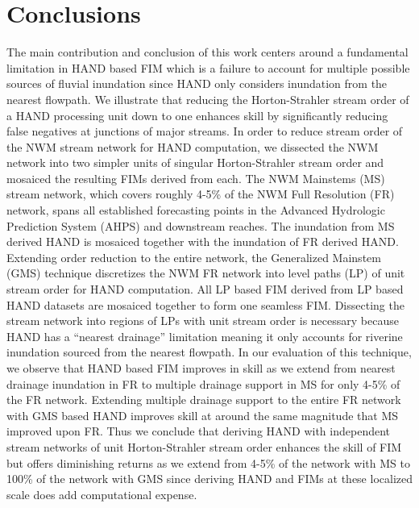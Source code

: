 \section{Conclusions}
\label{sec:conclusions}
%
The main contribution and conclusion of this work centers around a fundamental limitation in HAND based FIM which is a failure to account for multiple possible sources of fluvial inundation since HAND only considers inundation from the nearest flowpath.
We illustrate that reducing the Horton-Strahler stream order of a HAND processing unit down to one enhances skill by significantly reducing false negatives at junctions of major streams.
In order to reduce stream order of the NWM stream network for HAND computation, we dissected the NWM network into two simpler units of singular Horton-Strahler stream order and mosaiced the resulting FIMs derived from each.
The NWM Mainstems (MS) stream network, which covers roughly 4-5\% of the NWM Full Resolution (FR) network, spans all established forecasting points in the Advanced Hydrologic Prediction System (AHPS) and downstream reaches.
The inundation from MS derived HAND is mosaiced together with the inundation of FR derived HAND.
Extending order reduction to the entire network, the Generalized Mainstem (GMS) technique discretizes the NWM FR network into level paths (LP) of unit stream order for HAND computation.
All LP based FIM derived from LP based HAND datasets are mosaiced together to form one seamless FIM.
Dissecting the stream network into regions of LPs with unit stream order is necessary because HAND has a ``nearest drainage'' limitation meaning it only accounts for riverine inundation sourced from the nearest flowpath.
In our evaluation of this technique, we observe that HAND based FIM improves in skill as we extend from nearest drainage inundation in FR to multiple drainage support in MS for only 4-5\% of the FR network.
Extending multiple drainage support to the entire FR network with GMS based HAND improves skill at around the same magnitude that MS improved upon FR.
Thus we conclude that deriving HAND with independent stream networks of unit Horton-Strahler stream order enhances the skill of FIM but offers diminishing returns as we extend from 4-5\% of the network with MS to 100\% of the network with GMS since deriving HAND and FIMs at these localized scale does add computational expense.

